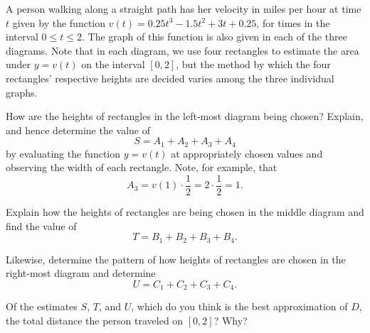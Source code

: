 \begin{pa} \label{PA:4.2}
A person walking along a straight path has her velocity in miles per hour at time $t$ given by the function $v(t) = 0.25t^3-1.5t^2+3t+0.25$, for times in the interval $0 \le t \le 2$.  The graph of this function is also given in each of the three diagrams. Note that in each diagram, we use four rectangles to estimate the area under $y = v(t)$ on the interval $[0,2]$, but the method by which the four rectangles' respective heights are decided varies among the three individual graphs.
\ba
\item How are the heights of rectangles in the left-most diagram being chosen?  Explain, and hence determine the value of 
\[ S = A_1 + A_2 + A_3 + A_4 \]
by evaluating the function $y = v(t)$ at appropriately chosen values and observing the width of each rectangle.  Note, for example, that 
\[ A_3 = v(1) \cdot \frac{1}{2} = 2 \cdot \frac{1}{2} = 1. \]

\item Explain how the heights of rectangles are being chosen in the middle diagram and find the value of
\[ T = B_1 + B_2 + B_3 + B_4. \]

\item Likewise, determine the pattern of how heights of rectangles are chosen in the right-most diagram and determine
\[ U = C_1 + C_2 + C_3 + C_4. \]
	
\item Of the estimates $S$, $T$, and $U$, which do you think is the best approximation of $D$, the total distance the person traveled on $[0,2]$?  Why?
\ea
\end{pa} 
\afterpa